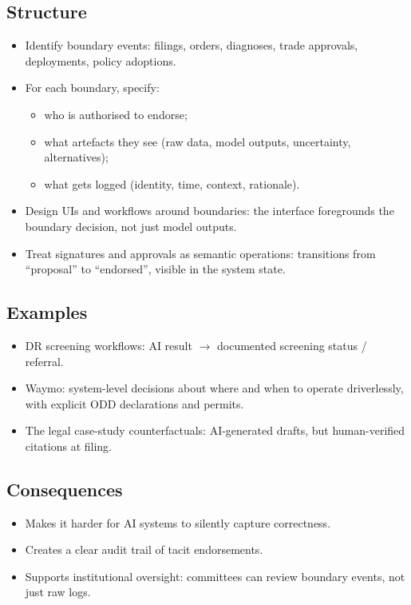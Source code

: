 \subsection*{Structure}

\begin{itemize}
  \item Identify boundary events:
        filings, orders, diagnoses, trade approvals, deployments,
        policy adoptions.
  \item For each boundary, specify:
        \begin{itemize}
          \item who is authorised to endorse;
          \item what artefacts they see (raw data, model outputs,
                uncertainty, alternatives);
          \item what gets logged (identity, time, context, rationale).
        \end{itemize}
  \item Design UIs and workflows around boundaries:
        the interface foregrounds the boundary decision, not just model
        outputs.
  \item Treat signatures and approvals as semantic operations:
        transitions from ``proposal'' to ``endorsed'', visible in the
        system state.
\end{itemize}

\subsection*{Examples}

\begin{itemize}
  \item DR screening workflows:
        AI result $\to$ documented screening status / referral.
  \item Waymo:
        system-level decisions about where and when to operate
        driverlessly, with explicit ODD declarations and permits.
  \item The legal case-study counterfactuals:
        AI-generated drafts, but human-verified citations at filing.
\end{itemize}

\subsection*{Consequences}

\begin{itemize}
  \item Makes it harder for AI systems to silently capture correctness.
  \item Creates a clear audit trail of tacit endorsements.
  \item Supports institutional oversight: committees can review
        boundary events, not just raw logs.
\end{itemize}


